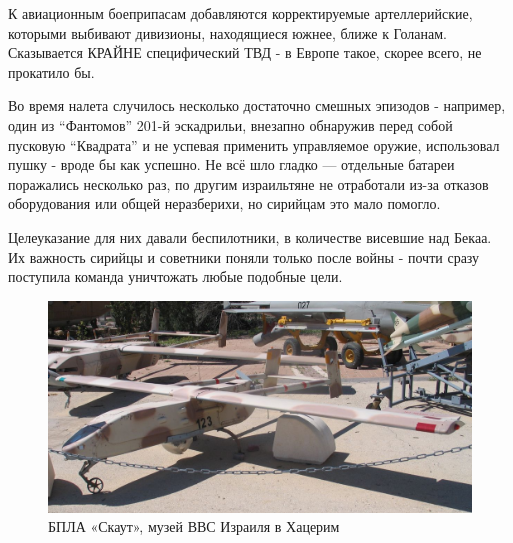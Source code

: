 К авиационным боеприпасам добавляются корректируемые артеллерийские, которыми выбивают дивизионы, находящиеся южнее, ближе к Голанам. Сказывается КРАЙНЕ специфический ТВД - в Европе такое, скорее всего, не прокатило бы.

Во время налета случилось несколько достаточно смешных эпизодов - например, один из “Фантомов” 201-й эскадрильи, внезапно обнаружив перед собой пусковую “Квадрата” и не успевая применить управляемое оружие, использовал пушку - вроде бы как успешно. Не всё шло гладко — отдельные батареи поражались несколько раз, по другим израильтяне не отработали из-за отказов оборудования или общей неразберихи, но сирийцам это мало помогло.

Целеуказание для них давали беспилотники, в количестве висевшие над Бекаа. Их важность сирийцы и советники поняли только после войны - почти сразу поступила команда уничтожать любые подобные цели. 

\begin{figure}[h!tb] 
	\centering\includegraphics[scale=0.3]{Bekaa_2/Q1AcDv3Bxdc.jpg}
	\caption{БПЛА «Скаут», музей ВВС Израиля в Хацерим}
\end{figure}	


